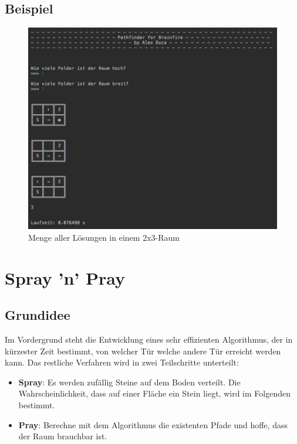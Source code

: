 \documentclass[a4paper,10pt,ngerman]{scrartcl}
\begin{document}
		\newpage
		\subsection{Beispiel}
		
			\begin{figure}[h!]
				\begin{center}
					\includegraphics[width=1\textwidth]{2x3Beispiel.png}
					\caption{Menge aller Lösungen in einem 2x3-Raum}
				\end{center}
			\end{figure}





	\newpage
	\section{Spray 'n' Pray}
	
		\subsection{Grundidee}
		
			Im Vordergrund steht die Entwicklung eines sehr effizienten Algorithmus, der in kürzester Zeit bestimmt, von welcher Tür welche andere Tür erreicht werden kann. Das restliche Verfahren wird in zwei Teilschritte unterteilt:
			
			\begin{itemize}
				\item \textbf{Spray}: Es werden zufällig Steine auf dem Boden verteilt. Die Wahrscheinlichkeit, dass auf einer Fläche ein Stein liegt, wird im Folgenden bestimmt.
				\item \textbf{Pray}: Berechne mit dem Algorithmus die existenten Pfade und hoffe, dass der Raum brauchbar ist.
			\end{itemize}
	
\end{document}
